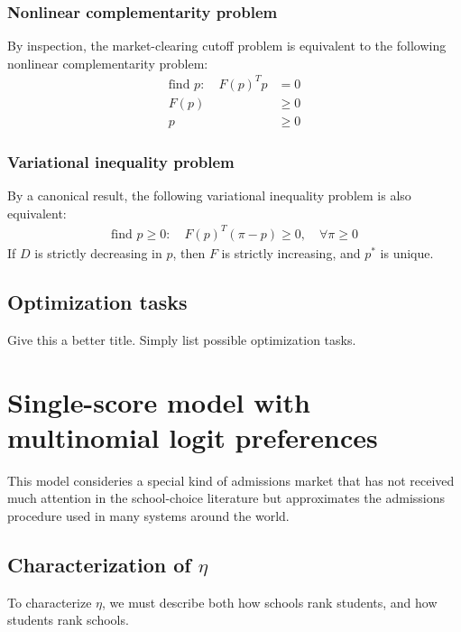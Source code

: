 \documentclass[12pt]{article}
\theoremstyle{definition}
\begin{document}
\subsubsection{Nonlinear complementarity problem}
By inspection, the market-clearing cutoff problem is equivalent to the following nonlinear complementarity problem:
\begin{align*}
\text{find } p:\quad F(p)^T p & = 0 \\[0.5em] F(p) &\geq 0 \\[0.5em] p & \geq 0
\end{align*}

\subsubsection{Variational inequality problem}
By a canonical result, the following variational inequality problem is also equivalent: %
\begin{align*}
\text{find } p \geq 0:\quad F(p)^T (\pi-p) \geq 0, \quad \forall \pi \geq 0
\end{align*}
If $D$ is strictly decreasing in $p$, then $F$ is strictly increasing, and $p^*$ is unique.

\subsection{Optimization tasks}
Give this a better title. Simply list possible optimization tasks. 










\section{Single-score model with multinomial logit preferences} \label{modeldescription}
This model consideries a special kind of admissions market that has not received much attention in the school-choice literature but approximates the admissions procedure used in many systems around the world.

\subsection{Characterization of $\eta$}

To characterize $\eta$, we must describe both how schools rank students, and how students rank schools.
\end{document}
